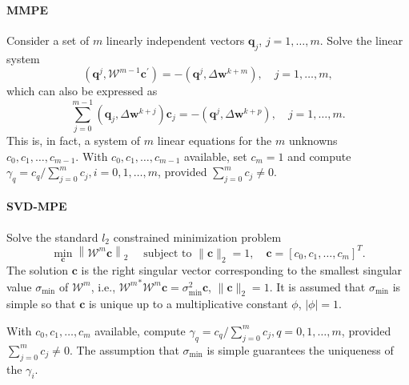 \paragraph{MMPE}

Consider a set of \(m\) linearly independent vectors \(\mathbf q_j\), \(j=1, \dots, m\).
Solve the linear system
\begin{equation}
  \left(\mathbf q^{j}, \mathscr W^{m-1} \mathbf c^{\prime}\right)=-\left(\mathbf q^{j}, \Delta \mathbf w^{k+m}\right), \quad j=1, \ldots, m,
\end{equation}
which can also be expressed as
\begin{equation}
  \sum_{j=0}^{m-1}\left(\mathbf q_{j}, \Delta \mathbf w^{k+j}\right) \mathbf c_{j}=-\left(\mathbf q^{j}, \Delta \mathbf w^{k+p}\right), \quad j=1, \ldots, m.
\end{equation}
This is, in fact, a system of \(m\) linear equations for the \(m\) unknowns \(c_{0}, c_{1}, \ldots, c_{m-1}\).
With \(c_{0}, c_{1}, \ldots, c_{m-1}\) available, set \(c_{m}=1\) and compute \(\gamma_{q}=c_{q} / \sum_{j=0}^{m} c_{j}, i=0,1, \ldots, m\), provided \(\sum_{j=0}^{m} c_{j} \neq 0\).

\paragraph{SVD-MPE}

Solve the standard \(l_{2}\) constrained minimization problem
\begin{equation}
  \min_{\mathbf c}\left\|\mathscr W^{m} \mathbf c\right\|_{2} \quad \text { subject to }\|\mathbf c\|_{2}=1, \quad \mathbf c=\left[c_{0}, c_{1}, \ldots, c_{m}\right]^{T} .
\end{equation}
The solution \(\mathbf c\) is the right singular vector corresponding to the smallest singular value \(\sigma_{\min }\) of \(\mathscr W^{m}\), i.e., \({\mathscr W^{m}}^{*} \mathscr W^{m} \mathbf c=\sigma_{\min }^{2} \mathbf c\), \(\|\mathbf c\|_{2}=1\).
It is assumed that \(\sigma_{\min }\) is simple so that \(\mathbf c\) is unique up to a multiplicative constant \(\phi\), \(|\phi|=1\).

With \(c_{0}, c_{1}, \ldots, c_{m}\) available, compute \(\gamma_{q}=c_{q} / \sum_{j=0}^{m} c_{j}, q=0,1, \ldots, m\), provided \(\sum_{j=0}^{m} c_{j} \neq 0\).
The assumption that \(\sigma_{\min }\) is simple guarantees the uniqueness of the \(\gamma_{i}\).

